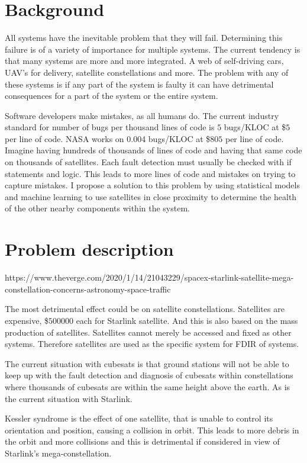 \section{Background}
All systems have the inevitable problem that they will fail. Determining this failure is of a variety of importance for multiple systems. The current tendency is that many systems are more and more integrated. A web of self-driving cars, UAV's for delivery, satellite constellations and more. The problem with any of these systems is if any part of the system is faulty it can have detrimental consequences for a part of the system or the entire system.

Software developers make mistakes, as all humans do. The current industry standard for number of bugs per thousand lines of code is $5$ bugs/KLOC at \$$5$ per line of code. NASA works on 0.004 bugs/KLOC at \$$805$ per line of code. Imagine having hundreds of thousands of lines of code and having that same code on thousands of satellites. Each fault detection must usually be checked with if statements and logic. This leads to more lines of code and mistakes on trying to capture mistakes. I propose a solution to this problem by using statistical models and machine learning to use satellites in close proximity to determine the health of the other nearby components within the system.

\section{Problem description}

https://www.theverge.com/2020/1/14/21043229/spacex-starlink-satellite-mega-constellation-concerns-astronomy-space-traffic

The most detrimental effect could be on satellite constellations. Satellites are expensive, \$$500 000$ each for Starlink satellite. And this is also based on the mass production of satellites. Satellites cannot merely be accessed and fixed as other systems. Therefore satellites are used as the specific system for FDIR of systems.

The current situation with cubesats is that ground stations will not be able to keep up with the fault detection and diagnosis of cubesats within constellations where thousands of cubesats are within the same height above the earth. As is the current situation with Starlink.

Kessler syndrome is the effect of one satellite, that is unable to control its orientation and position, causing a collision in orbit. This leads to more debris in the orbit and more collisions and this is detrimental if considered in view of Starlink's mega-constellation.

